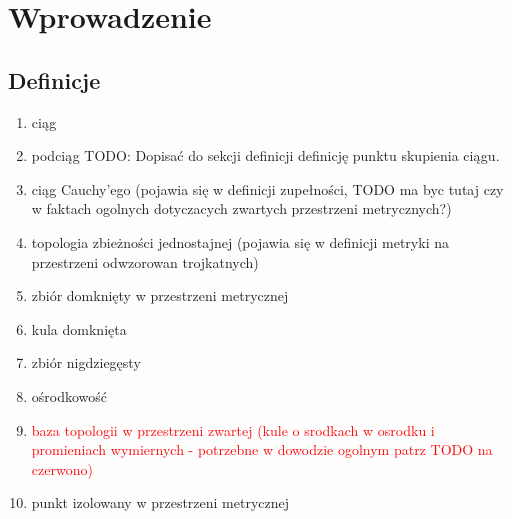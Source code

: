 \documentclass[licencjacka]{pwr_wmat_praca_dyplomowa}
\theoremstyle{plain}
\numberwithin{theorem}{chapter}
\theoremstyle{definition}
\numberwithin{theorem}{chapter}
\begin{document}
\chapter{Wprowadzenie}

\section{Definicje}



\begin{enumerate}
\item ciąg
\item podciąg
TODO: Dopisać do sekcji definicji definicję punktu skupienia ciągu.
\item ciąg Cauchy'ego (pojawia się w definicji zupełności, TODO ma byc tutaj czy w faktach ogolnych dotyczacych zwartych przestrzeni metrycznych?)


\item topologia zbieżności jednostajnej (pojawia się w definicji metryki na przestrzeni odwzorowan trojkatnych)
\item zbiór domknięty w przestrzeni metrycznej
\item kula domknięta






\item zbiór nigdziegęsty
\item ośrodkowość
\item \textcolor{red}{baza topologii w przestrzeni zwartej (kule o srodkach w osrodku i promieniach wymiernych - potrzebne w dowodzie ogolnym patrz TODO na czerwono)}
\item punkt izolowany w przestrzeni metrycznej



\end{enumerate}
\end{document}

